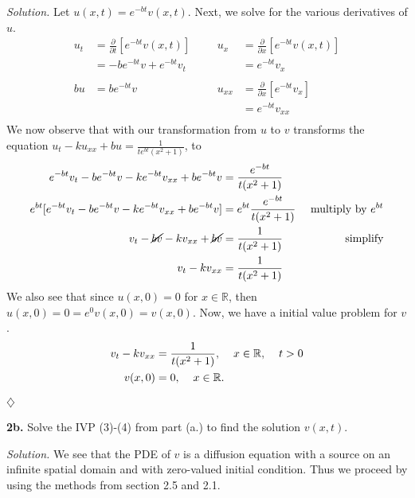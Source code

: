 \documentclass{article}
\begin{document}
\vspace{3mm}
\textit{Solution.} Let \(u(x,t) = e^{-bt}v(x,t)\). Next, we solve for the various derivatives of \(u\). 
\begin{align*}
u_t&=\frac{\partial}{\partial t} [e^{-bt}v(x,t)	]& 	&	&	u_x&=\frac{\partial}{\partial x} [e^{-bt}v(x,t)	]	 \\
&= -be^{-bt}v+ e^{-bt}v_t 	& 	&	&	&=e^{-bt}v_x	 \\
& 	& 	&	&	&	 \\
bu&= be^{-bt}v	& 	&	&	u_{xx}&=\frac{\partial}{\partial x}[e^{-bt}v_x]	 \\
& 	& 	&	&	&=e^{-bt}v_{xx}	 \\
\end{align*}
We now observe that with our transformation from \(u\) to \(v\) transforms the equation \(u_t - ku_{xx} + bu = \frac{1}{te^{bt}(x^2+1)}\), to 
\begin{align*}
e^{-bt}v_t -be^{-bt}v -ke^{-bt}v_{xx}+ be^{-bt}v &= \frac{e^{- bt}}{t(x^2+1)}   &  & \\ 
e^{bt}[e^{-bt}v_t -be^{-bt}v -ke^{-bt}v_{xx}+ be^{-bt}v] &= e^{bt} \frac{e^{- bt}}{t(x^2+1)}   &  \text{ multiply by }e^{bt}& \\ 
v_t-\cancel{bv}-kv_{xx} + \cancel{bv} &= \frac{1}{t(x^2+1)}  &  \text{ simplify} &  \\
v_t - kv_{xx} &= \frac{1}{t(x^2+1)} 
\end{align*}
We also see that since \(u(x,0)= 0\) for \(x\in \mathbb{R}\), then \(u(x,0)=0= e^{0}v(x,0) = v(x,0) \). 
Now, we have a initial value problem for \(v\). 
\begin{align*}
v_t - kv_{xx} &= \frac{1}{t(x^2+1)}, \hspace{4mm} x\in\mathbb{R}, \hspace{4mm} t>0\\
v(x,0)&= 0, \hspace{4mm} x\in\mathbb{R}.
\end{align*}
\begin{flushright}
\( \diamondsuit \)
\end{flushright}


\newpage
\textbf{2b.} Solve the IVP (3)-(4) from part (a.) to find the solution \(v(x,t)\). 


\vspace{3mm}
\textit{Solution.} We see that the PDE of \(v\) is a diffusion equation with a source on an infinite spatial domain and with zero-valued initial condition. Thus we proceed by using the methods from section 2.5 and 2.1. 
\end{document}
